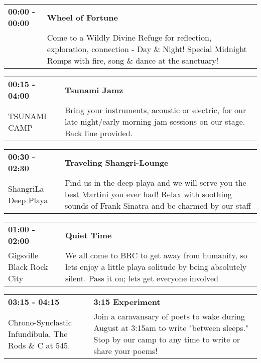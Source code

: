 \begin{tabular}{ p{1in} p{2.2in} }
    \textbf{00:00 - 00:00} & \textbf{Wheel of Fortune} \\
    ~ \newline  & Come to a Wildly Divine Refuge for reflection, exploration, connection - Day \& Night! Special Midnight Romps with fire, song \& dance at the sanctuary! \\
    \hline 
\end{tabular}
    
\begin{tabular}{ p{1in} p{2.2in} }
    \textbf{00:15 - 04:00} & \textbf{Tsunami Jamz} \\
    TSUNAMI CAMP \newline  & Bring your instruments, acoustic or electric, for our late night/early morning jam sessions on our stage.  Back line provided. \\
    \hline 
\end{tabular}
    
\begin{tabular}{ p{1in} p{2.2in} }
    \textbf{00:30 - 02:30} & \textbf{Traveling Shangri-Lounge} \\
    ShangriLa \newline Deep Playa & Find us in the deep playa and we will serve you the best Martini you ever had! Relax with soothing sounds of Frank Sinatra and be charmed by our staff \\
    \hline 
\end{tabular}
    
\begin{tabular}{ p{1in} p{2.2in} }
    \textbf{01:00 - 02:00} & \textbf{Quiet Time} \\
    Gigsville \newline Black Rock City & We all come to BRC to get away from humanity, so lets enjoy a little playa solitude by being absolutely silent. Pass it on; lets get everyone involved \\
    \hline 
\end{tabular}
    
\begin{tabular}{ p{1in} p{2.2in} }
    \textbf{03:15 - 04:15} & \textbf{3:15 Experiment} \\
    Chrono-Synclastic Infundibula, The \newline Rods \& C at 545. & Join a caravansary of poets to wake during August at 3:15am to write "between sleeps." Stop by our camp to any time to write or share your poems! \\
    \hline 
\end{tabular}
    
